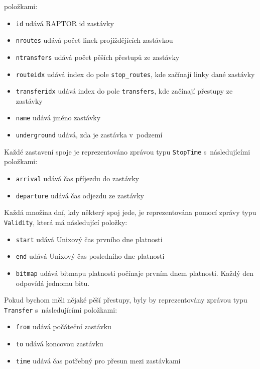 položkami:
\begin{itemize}
	\item {\tt id} udává RAPTOR id zastávky
	\item {\tt nroutes} udává počet linek projíždějících zastávkou
	\item {\tt ntransfers} udává počet pěších přestupů ze zastávky
	\item {\tt routeidx} udává index do pole {\tt stop\_routes}, kde
	začínají linky dané zastávky
	\item {\tt transferidx} udává index do pole {\tt transfers}, kde
	začínají přestupy ze zastávky
	\item {\tt name} udává jméno zastávky
	\item {\tt underground} udává, zda je zastávka v~podzemí
\end{itemize}
Každé zastavení spoje je reprezentováno zprávou typu {\tt StopTime}
s~následujícími položkami:
\begin{itemize}
	\item {\tt arrival} udává čas příjezdu do zastávky
	\item {\tt departure} udává čas odjezdu ze zastávky
\end{itemize}
Každá množina dní, kdy některý spoj jede, je reprezentována pomocí zprávy typu
{\tt Validity}, která má následující položky:
\begin{itemize}
	\item {\tt start} udává Unixový čas prvního dne platnosti 
	\item {\tt end} udává Unixový čas posledního dne platnosti
	\item {\tt bitmap} udává bitmapu platnosti počínaje prvním dnem
	platnosti. Každý den odpovídá jednomu bitu.
\end{itemize}
Pokud bychom měli nějaké pěší přestupy, byly by reprezentovány zprávou typu {\tt
Transfer} s~následujícími položkami:
\begin{itemize}
	\item {\tt from} udává počáteční zastávku
	\item {\tt to} udává koncovou zastávku
	\item {\tt time} udává čas potřebný pro přesun mezi zastávkami
\end{itemize}
